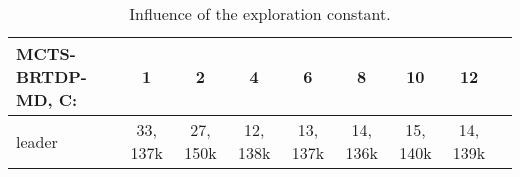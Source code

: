 \begin{landscape}
\begin{table}
    \begin{tabularx}{\textwidth}{ l | C | C | C  | C  | C  | C  | C  | C  }
    \toprule
        MCTS-BRTDP-MD, C: & 1 & 2 & 4 & 6 & 8 & 10 & 12 \\
    \midrule
    leader                & 33, 137k & 27, 150k & 12, 138k & 13, 137k & 14, 136k & 15, 140k & 14, 139k \\
\end{tabularx}
\caption{Influence of the exploration constant.}
\label{table:ucb_leader}
\end{table}
\end{landscape}






